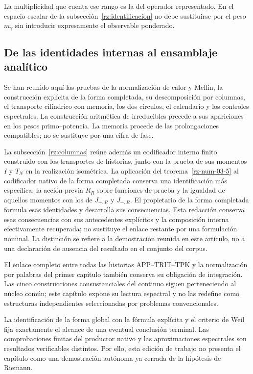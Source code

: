 La multiplicidad que cuenta ese rango es la del operador representado. En el espacio escalar de la subsección~\ref{rz:identificacion} no debe sustituirse por el peso \(m_\gamma\) sin introducir expresamente el observable ponderado.

\subsection{De las identidades internas al ensamblaje analítico}
\label{rz:alcance}
Se han reunido aquí las pruebas de la normalización de calor y Mellin, la construcción explícita de la forma completada, su descomposición por columnas, el transporte cilíndrico con memoria, los dos círculos, el calendario y los controles espectrales. La construcción aritmética de irreducibles precede a sus apariciones en los pesos primo–potencia. La memoria procede de las prolongaciones compatibles; no se sustituye por una cifra de fase.

La subsección~\ref{rz:columnas} reúne además un codificador interno finito construido con los transportes de historias, junto con la prueba de sus momentos \(I\) y \(T_N\) en la realización isométrica. La aplicación del teorema~\ref{rz-num-03-5} al codificador nativo de la forma completada conserva una identificación más específica: la acción previa \(R_R\) sobre funciones de prueba y la igualdad de aquellos momentos con los de \(J_{+,R}\) y \(J_{-,R}\). El propietario de la forma completada formula esas identidades y desarrolla sus consecuencias. Esta redacción conserva esas consecuencias con sus antecedentes explícitos y la composición interna efectivamente recuperada; no sustituye el enlace restante por una formulación nominal. La distinción se refiere a la demostración reunida en este artículo, no a una declaración de ausencia del resultado en el conjunto del corpus.

El enlace completo entre todas las historias APP–TRIT–TPK y la normalización por palabras del primer capítulo también conserva su obligación de integración. Las cinco construcciones consustanciales del continuo siguen perteneciendo al núcleo común; este capítulo expone su lectura espectral y no las redefine como estructuras independientes seleccionadas por problemas convencionales.

La identificación de la forma global con la fórmula explícita y el criterio de Weil fija exactamente el alcance de una eventual conclusión terminal. Las comprobaciones finitas del productor nativo y las aproximaciones espectrales son resultados verificables distintos. Por ello, esta edición de trabajo no presenta el capítulo como una demostración autónoma ya cerrada de la hipótesis de Riemann.

